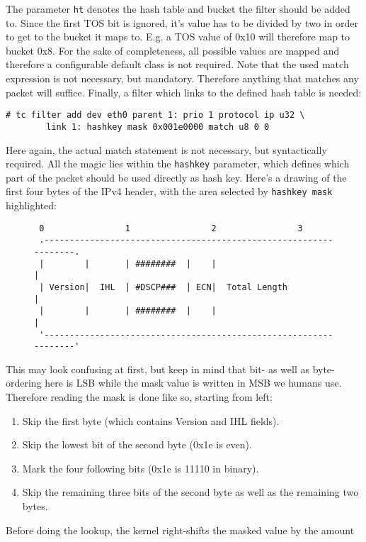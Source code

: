 \documentclass[12pt,twoside]{article}
\begin{document}
The parameter \texttt{ht} denotes the hash table and bucket the filter should be added
to. Since the first TOS bit is ignored, it's value has to be divided by two in
order to get to the bucket it maps to. E.g. a TOS value of 0x10 will therefore
map to bucket 0x8.  For the sake of completeness, all possible values are mapped
and therefore a configurable default class is not required. Note that the used
match expression is not necessary, but mandatory. Therefore anything that
matches any packet will suffice. Finally, a filter which links to the defined
hash table is needed:
\begin{Verbatim}
# tc filter add dev eth0 parent 1: prio 1 protocol ip u32 \
        link 1: hashkey mask 0x001e0000 match u8 0 0
\end{Verbatim}
Here again, the actual match statement is not necessary, but syntactically
required. All the magic lies within the \texttt{hashkey} parameter, which defines which
part of the packet should be used directly as hash key. Here's a drawing of the
first four bytes of the IPv4 header, with the area selected by \texttt{hashkey mask}
highlighted:
\begin{figure}[H]
\begin{Verbatim}
 0                1                2                3
 .-----------------------------------------------------------------.
 |        |       | ########  |    |                               |
 | Version|  IHL  | #DSCP###  | ECN|  Total Length                 |
 |        |       | ########  |    |                               |
 '-----------------------------------------------------------------'
\end{Verbatim}
\end{figure}
\noindent
This may look confusing at first, but keep in mind that bit- as well as
byte-ordering here is LSB while the mask value is written in MSB we humans use.
Therefore reading the mask is done like so, starting from left:
\begin{enumerate}
\item Skip the first byte (which contains Version and IHL fields).
\item Skip the lowest bit of the second byte (0x1e is even).
\item Mark the four following bits (0x1e is 11110 in binary).
\item Skip the remaining three bits of the second byte as well as the remaining two
   bytes.
\end{enumerate}
Before doing the lookup, the kernel right-shifts the masked value by the amount
\end{document}
